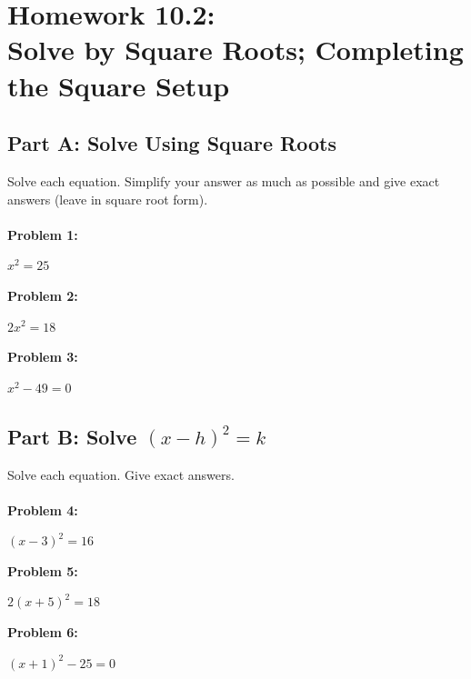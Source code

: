 \documentclass[12pt]{article}
\begin{document}
		\newpage

	\section*{Homework 10.2: \\ Solve by Square Roots; Completing the Square Setup}

		\subsection*{Part A: Solve Using Square Roots}

			Solve each equation. Simplify your answer as much as possible and give exact answers (leave in square root form).\\\\

			\textbf{Problem 1:}
            
            $x^2 = 25$

			\vspace{3cm}

			\textbf{Problem 2:}
            
            $2x^2 = 18$

			\vspace{3cm}

			\textbf{Problem 3:}
            
            $x^2 - 49 = 0$

			\newpage

		\subsection*{Part B: Solve $(x - h)^2 = k$}

			Solve each equation. Give exact answers.\\\\

			\textbf{Problem 4:}
            
            $(x - 3)^2 = 16$

			\vspace{4cm}

			\textbf{Problem 5:}
            
            $2(x + 5)^2 = 18$

			\vspace{4cm}

			\textbf{Problem 6:}
            
            $(x + 1)^2 - 25 = 0$

			\newpage
\end{document}
